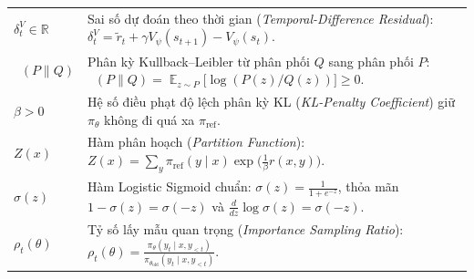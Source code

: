\documentclass[11pt,a4paper,oneside]{report}
\DeclareMathOperator{\E}{\mathbb{E}}
\DeclareMathOperator{\DKL}{\mathbb{D}_{\mathrm{KL}}}
\theoremstyle{plain}
\theoremstyle{definition}
\theoremstyle{remark}
\begin{document}
\begin{longtable}{p{3.2cm} p{11.8cm}}
$\delta_t^V \in \mathbb{R}$ & Sai số dự đoán theo thời gian (\textit{Temporal-Difference Residual}): $\delta_t^V = \tilde{r}_t + \gamma V_\psi(s_{t+1}) - V_\psi(s_t)$. \\
$\DKL(P \parallel Q)$ & Phân kỳ Kullback--Leibler từ phân phối $Q$ sang phân phối $P$: $\DKL(P \parallel Q) = \E_{z \sim P}\big[\log(P(z)/Q(z))\big] \ge 0$. \\
$\beta > 0$ & Hệ số điều phạt độ lệch phân kỳ KL (\textit{KL-Penalty Coefficient}) giữ $\pi_\theta$ không đi quá xa $\pi_{\text{ref}}$. \\
$Z(x)$ & Hàm phân hoạch (\textit{Partition Function}): $Z(x) = \sum_{y} \pi_{\text{ref}}(y \mid x)\exp\big(\frac{1}{\beta}r(x, y)\big)$. \\
$\sigma(z)$ & Hàm Logistic Sigmoid chuẩn: $\sigma(z) = \frac{1}{1 + e^{-z}}$, thỏa mãn $1 - \sigma(z) = \sigma(-z)$ và $\frac{d}{dz}\log\sigma(z) = \sigma(-z)$. \\
$\rho_t(\theta)$ & Tỷ số lấy mẫu quan trọng (\textit{Importance Sampling Ratio}): $\rho_t(\theta) = \frac{\pi_\theta(y_t \mid x, y_{<t})}{\pi_{\theta_{\text{old}}}(y_t \mid x, y_{<t})}$. \\
\end{longtable}










\end{document}
